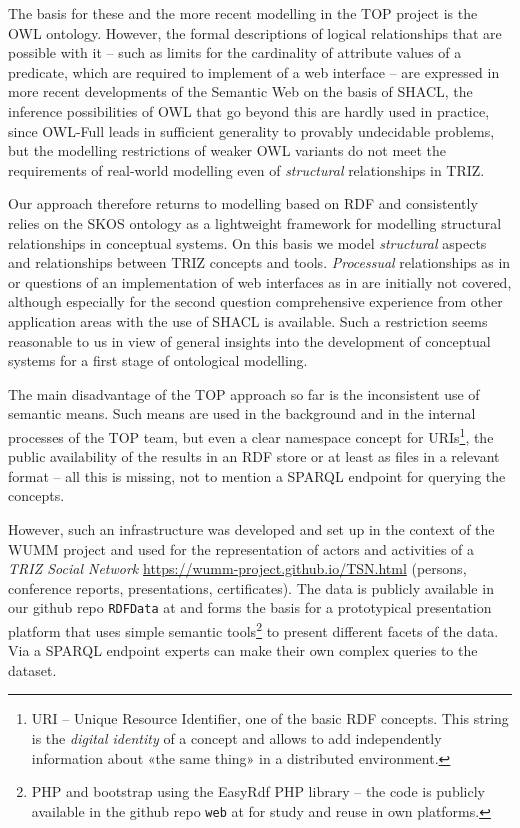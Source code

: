 \documentclass[11pt,a4paper]{article}
\begin{document}
The basis for these and the more recent modelling in the TOP project is the
OWL ontology. However, the formal descriptions of logical relationships that
are possible with it -- such as limits for the cardinality of attribute values
of a predicate, which are required to implement of a web interface -- are
expressed in more recent developments of the Semantic Web on the basis of
SHACL, the inference possibilities of OWL that go beyond this are hardly used
in practice, since OWL-Full leads in sufficient generality to provably
undecidable problems, but the modelling restrictions of weaker OWL variants do
not meet the requirements of real-world modelling even of \emph{structural}
relationships in TRIZ.

Our approach therefore returns to modelling based on RDF and consistently
relies on the SKOS ontology as a lightweight framework for modelling
structural relationships in conceptual systems. On this basis we model
\emph{structural} aspects and relationships between TRIZ concepts and tools.
\emph{Processual} relationships as in \cite{Bultey2015} or questions of an
implementation of web interfaces as in \cite{Cavallucci2011} are initially not
covered, although especially for the second question comprehensive experience
from other application areas with the use of SHACL is available. Such a
restriction seems reasonable to us in view of general insights into the
development of conceptual systems \cite{Vygotsky1934} for a first stage of
ontological modelling.

The main disadvantage of the TOP approach so far is the inconsistent use of
semantic means. Such means are used in the background and in the internal
processes of the TOP team, but even a clear namespace concept for
URIs\footnote{URI -- Unique Resource Identifier, one of the basic RDF
  concepts. This string is the \emph{digital identity} of a concept and allows
  to add independently information about «the same thing» in a distributed
  environment. }, the public availability of the results in an RDF store or at
least as files in a relevant format -- all this is missing, not to mention a
SPARQL endpoint for querying the concepts.

However, such an infrastructure was developed and set up in the context of the
WUMM project \cite{WUMM-pages} and used for the representation of actors and
activities of a \emph{TRIZ Social Network}
\url{https://wumm-project.github.io/TSN.html} (persons, conference reports,
presentations, certificates). The data is publicly available in our github
repo \texttt{RDFData} at \cite{WUMM-github} and forms the basis for a
prototypical presentation platform \cite{WUMM-web} that uses simple semantic
tools\footnote{PHP and bootstrap using the EasyRdf PHP library -- the code is
  publicly available in the github repo \texttt{web} at \cite{WUMM-github} for
  study and reuse in own platforms.} to present different facets of the
data. Via a SPARQL endpoint \cite{WUMM-sparql} experts can make their own
complex queries to the dataset.
\end{document}
